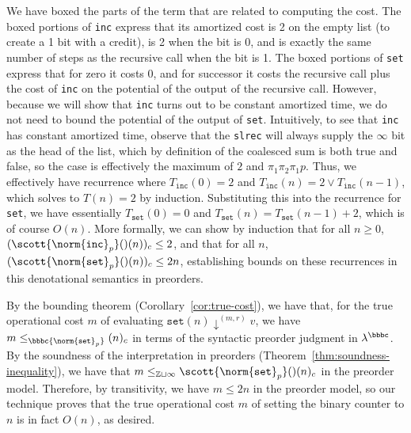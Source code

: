 We have boxed the parts of the term that are related to computing the
cost.  The boxed portions of \texttt{inc} express that its amortized
cost is 2 on the empty list (to create a 1 bit with a credit), is 2 when
the bit is 0, and is exactly the same number of steps as the recursive
call when the bit is 1.  The boxed portions of \texttt{set} express that
for zero it costs 0, and for successor it costs the recursive call plus
the cost of \texttt{inc} on the potential of the output of the recursive
call.  However, because we will show that \texttt{inc} turns out to be
constant amortized time, we do not need to bound the potential of the
output of \texttt{set}.  Intuitively, to see that \texttt{inc} has
constant amortized time, observe that the \texttt{slrec} will always
supply the $\infty$ bit as the head of the list, which by definition of
the coalesced sum is both true and false, so the case is effectively the
maximum of $2$ and $\pi_1 \pi_2 \pi_1 p$.  Thus, we effectively have
recurrence where $T_{\texttt{inc}}(0) = 2$ and $T_{\texttt{inc}}(n) = 2
\vee T_{\texttt{inc}}(n-1)$, which solves to $T(n) = 2$ by induction.
Substituting this into the recurrence for \texttt{set}, we have
essentially $T_{\texttt{set}}(0) = 0$ and $T_{\texttt{set}}(n) =
T_{\texttt{set}}(n-1) + 2$, which is of course $O(n)$.  More formally,
we can show by induction that for all $n \geq 0$,
$(\scott{\norm{\texttt{inc}}_p}()(n))_c \leq 2$, and that for all $n$,
$(\scott{\norm{\texttt{set}}_p}()(n))_c \leq 2n$,
establishing bounds on these recurrences in this denotational semantics
in preorders.  

By the bounding theorem (Corollary~\ref{cor:true-cost}), we have that,
for the true operational cost $m$ of evaluating $\texttt{set}(n)
\downarrow^{(m,r)} v$, we have $m \le_\bbbc {\norm{\texttt{set}}_p}(n)_c$
in terms of the syntactic preorder judgment in $\lambda^\bbbc$.  By the
soundness of the interpretation in preorders
(Theorem~\ref{thm:soundness-inequality}), we have that $m
\le_{\mathbb{Z} \sqcup \infty} \scott{\norm{\texttt{set}}_p}()(n)_c$ in
the preorder model.  Therefore, by transitivity, we have $m \le 2n$ in
the preorder model, so our technique proves that the true operational
cost $m$ of setting the binary counter to $n$ is in fact $O(n)$,
as desired.



